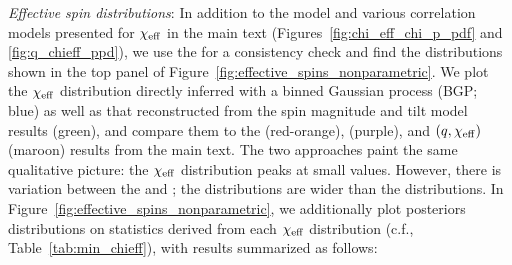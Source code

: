 \textit{Effective spin distributions}: In addition to the \skewnormalChiEff model and various correlation models presented for $\chi_{\rm eff}$ in the main text (Figures~\ref{fig:chi_eff_chi_p_pdf} and \ref{fig:q_chieff_ppd}), we use the \nonparametric for a consistency check and find the distributions shown in the top panel of Figure~\ref{fig:effective_spins_nonparametric}. 
We plot the $\chi_{\rm eff}$ distribution directly inferred with a binned Gaussian process (BGP; blue) as well as that reconstructed from the spin magnitude and tilt \BSpline model results (green), and compare them to the \skewnormalChiEff (red-orange), \effectiveSpinModel (purple), and $(q,\chi_{\rm eff})$ \splinecorrelation (maroon) results from the main text. 
The two approaches paint the same qualitative picture: the $\chi_{\rm eff}$ distribution peaks at small values.
However, there is variation between the \nonparametric and \parametric; the \nonparametricAdj distributions are wider than the \parametricAdj distributions.
In Figure~\ref{fig:effective_spins_nonparametric}, we additionally plot posteriors distributions on statistics derived from each $\chi_{\rm eff}$ distribution (c.f., Table~\ref{tab:min_chieff}), with results summarized as follows:
%
